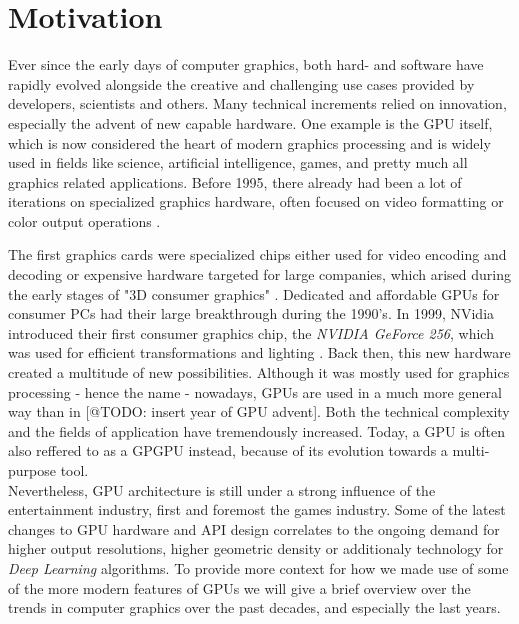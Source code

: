 \chapter{Motivation} \label{cpt-motivation}



Ever since the early days of computer graphics, both hard- and software have rapidly evolved
alongside the creative and challenging use cases provided by developers, scientists and others.
Many technical increments relied on innovation, especially the advent of new capable hardware.
One example is the \ac{GPU} itself, which is now considered the heart of modern graphics 
processing and is widely used in fields like science, artificial intelligence, games, and pretty 
much all graphics related applications. Before 1995, there already had been a lot of iterations 
on specialized graphics hardware, often focused on video formatting or color output operations
\cite{Singer2023}.

The first graphics cards were specialized chips either used for video encoding and decoding
or expensive hardware targeted for large companies, which arised during the early stages 
of "3D consumer graphics" \cite{Singer2023}. Dedicated and affordable \ac{GPU}s for consumer 
\ac{PC}s had their large breakthrough during the 1990's. In 1999, NVidia introduced their 
first consumer graphics chip, the \emph{NVIDIA GeForce 256}, which was used for efficient 
transformations and lighting \cite{Fenno2024}. Back then, this new hardware created a multitude 
of new possibilities. 
Although it was mostly used for graphics processing - hence the name - nowadays, \ac{GPU}s
are used in a much more general way than in [@TODO: insert year of GPU advent]. Both the 
technical complexity and the fields of application have tremendously increased. Today, a 
\ac{GPU} is often also reffered to as a \ac{GPGPU} instead, because of its evolution towards 
a multi-purpose tool. \\

\noindent
Nevertheless, \ac{GPU} architecture is still under a strong influence of the entertainment 
industry, first and foremost the games industry. Some of the latest changes to \ac{GPU} 
hardware and \ac{API} design correlates to the ongoing demand for higher output resolutions, 
higher geometric density or additionaly technology for \emph{Deep Learning} algorithms. 
To provide more context for how we made use of some of the more modern features of \ac{GPU}s 
we will give a brief overview over the trends in computer graphics over the past decades, and 
especially the last years.


